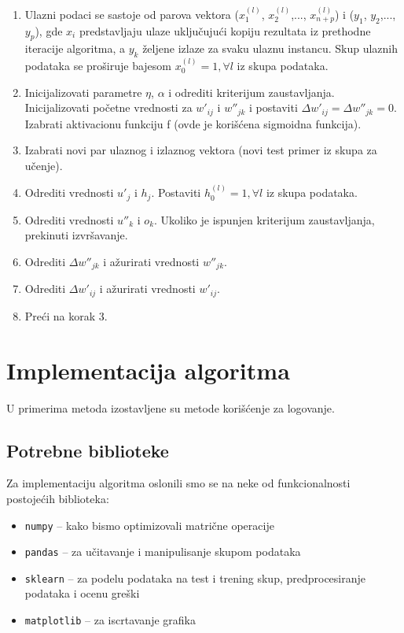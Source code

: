\documentclass[a4paper]{article}
\begin{document}
\begin{enumerate}
  \item Ulazni podaci se sastoje od parova vektora ($x^{(l)}_1$, $x^{(l)}_2$,..., $x^{(l)}_{n+p}$) i ($y_1$, $y_2$,..., $y_p$), gde $x_i$ predstavljaju ulaze uključujući kopiju rezultata iz prethodne iteracije algoritma, a $y_k$ željene izlaze za svaku ulaznu instancu. Skup ulaznih podataka se proširuje bajesom $x^{(l)}_0=1, {}\forall{l}$ iz skupa podataka.
  \item Inicijalizovati parametre $\eta{}$, $\alpha{}$ i odrediti kriterijum zaustavljanja. Inicijalizovati početne vrednosti za $w'_{ij}$ i $w{''}_{jk}$ i postaviti $\Delta{}w'_{ij}=\Delta{}w{''}_{jk}=0$. Izabrati aktivacionu funkciju f (ovde je korišćena sigmoidna funkcija).
  \item Izabrati novi par ulaznog i izlaznog vektora (novi test primer iz skupa za učenje).
  \item Odrediti vrednosti $u'_j$ i $h_j$. Postaviti $h^{(l)}_0=1, {}\forall{l}$ iz skupa podataka.
  \item Odrediti vrednosti $u{''}_k$ i $o_k$. Ukoliko je ispunjen kriterijum zaustavljanja, prekinuti izvršavanje.
  \item Odrediti $\Delta{}w{''}_{jk}$ i ažurirati vrednosti $w{''}_{jk}$.
  \item Odrediti $\Delta{}w{'}_{ij}$ i ažurirati vrednosti $w{'}_{ij}$.
  \item Preći na korak 3.
\end{enumerate}


\section{Implementacija algoritma}

U primerima metoda izostavljene su metode korišćenje za logovanje.

\subsection{Potrebne biblioteke}
Za implementaciju algoritma oslonili smo se na neke od funkcionalnosti postojećih biblioteka:
\begin{itemize}
    \item \texttt{numpy} -- kako bismo optimizovali matrične operacije
    \item \texttt{pandas} -- za učitavanje i manipulisanje skupom podataka
    \item \texttt{sklearn} -- za podelu podataka na test i trening skup, predprocesiranje podataka i ocenu greški
    \item \texttt{matplotlib} -- za iscrtavanje grafika
\end{itemize}
\end{document}
